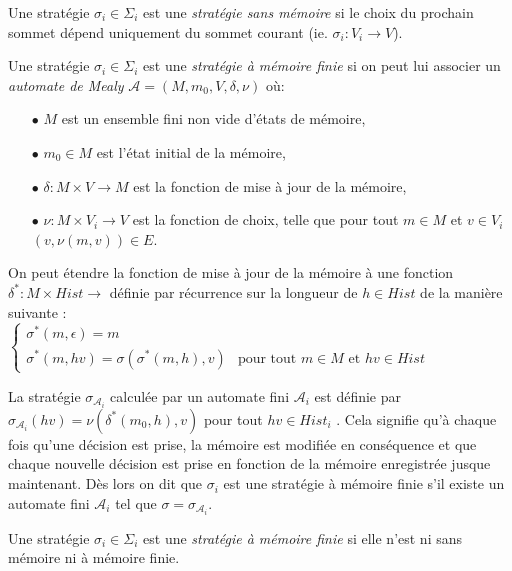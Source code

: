 \begin{defi}
	
	Une stratégie $\sigma _{i} \in \Sigma _{i}$ est une \textit{stratégie sans mémoire} si le choix du prochain sommet dépend uniquement du sommet courant (ie. $\sigma _{i}: V_{i} \rightarrow V$).
\end{defi}

\begin{defi}
	
	Une stratégie $\sigma _{i} \in \Sigma _{i}$ est une \textit{stratégie à mémoire finie} si on peut lui associer un \textit{automate de Mealy} $\mathcal{A} = (M, m_{0}, V, \delta, \nu)$ où:
	\begin{enumerate}
		\item[$\bullet$] $M$ est un ensemble fini non vide d'états de mémoire,
		\item[$\bullet$] $m_{0} \in M$ est l'état initial de la mémoire,
		\item[$\bullet$] $\delta : M \times V \rightarrow M$ est la fonction de mise à jour de la mémoire,
		\item[$\bullet$] $ \nu: M \times V_{i} \rightarrow V$ est la fonction de choix, telle que pour tout $m \in M$ et $v\in V_{i}$ $(v, \nu(m,v))\in E$.\end{enumerate}
		
		On peut étendre la fonction de mise à jour de la mémoire à une fonction $\delta ^{*}: M \times Hist \rightarrow$ définie par récurrence sur la longueur de $h \in Hist$ de la manière suivante :\\ $\begin{cases}
																	\sigma^{*}(m,\epsilon) = m	\\
																	\sigma^{*}(m,hv)=\sigma(\sigma^{*}(m,h),v) & \text{pour tout } m\in M \text{ et } hv\in Hist
																	\end{cases}$ 
																	
		La stratégie $\sigma _{\mathcal{A}_{i}}$ calculée par un automate fini $\mathcal{A}_{i}$ est définie par $\sigma _{\mathcal{A}_{i}}(hv) = \nu(\delta^{*}(m_{0},h),v)$ pour tout $hv \in Hist_{i}$ . Cela signifie qu'à chaque fois qu'une décision est prise, la mémoire est modifiée en conséquence et que chaque nouvelle décision est prise en fonction de la mémoire enregistrée jusque maintenant.
		Dès lors on dit que $\sigma _{i}$ est une stratégie à mémoire finie s'il existe un automate fini $\mathcal{A}_{i}$ tel que $\sigma = \sigma _{\mathcal{A}_{i}}$.		

\end{defi}

\begin{defi}
	
	Une stratégie $\sigma _{i} \in \Sigma _{i}$ est une \textit{stratégie à mémoire finie } si elle n'est ni sans mémoire ni à mémoire finie.
\end{defi}
